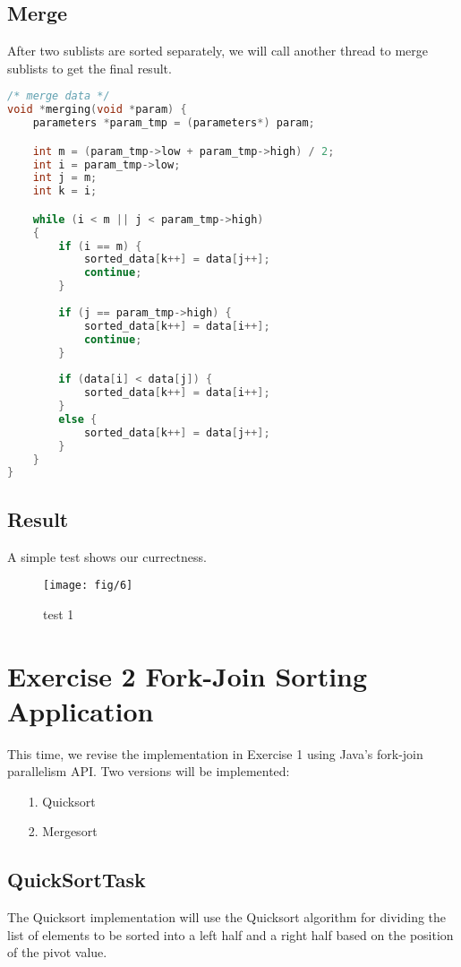 \documentclass{article}
\begin{document}
\subsection*{Merge}
After two sublists are sorted separately, we will call another thread to merge sublists to get the final result.

\begin{lstlisting}[language=c, caption={Merge}, captionpos=b]
/* merge data */
void *merging(void *param) {
    parameters *param_tmp = (parameters*) param;

    int m = (param_tmp->low + param_tmp->high) / 2;
    int i = param_tmp->low;
    int j = m;
    int k = i;

    while (i < m || j < param_tmp->high)
    {        
        if (i == m) {
            sorted_data[k++] = data[j++];
            continue;
        }
        
        if (j == param_tmp->high) {
            sorted_data[k++] = data[i++];
            continue;
        }
        
        if (data[i] < data[j]) {
            sorted_data[k++] = data[i++];
        }
        else {
            sorted_data[k++] = data[j++];
        }
    }
}
\end{lstlisting}

\subsection*{Result}
A simple test shows our currectness.

\begin{figure}[h]
    \centering
    
    \texttt{[image: fig/6]}
    \caption{test 1}
    \label{1}
\end{figure}

\section*{Exercise 2 Fork-Join Sorting Application}
This time, we revise the implementation in Exercise 1 using Java's fork-join parallelism API. Two versions will be implemented:

\begin{itemize}
    \item[1.] Quicksort
    \item[2.] Mergesort 
\end{itemize}

\subsection*{QuickSortTask}
The Quicksort implementation will use the Quicksort algorithm for dividing
the list of elements to be sorted into a left half and a right half based on the position of the pivot value. 
\end{document}
